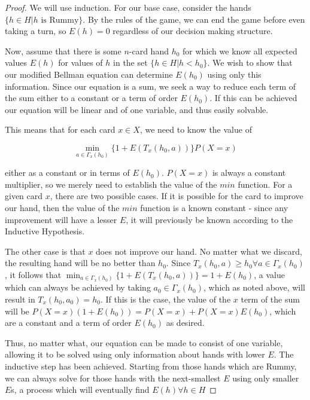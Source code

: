 \documentclass[letter,12pt]{article}
\begin{document}
\begin{proof}
We will use induction. For our base case, consider the hands $\{h \in H | h \textrm{ is Rummy}\}$. By the rules of the game, we can end the game before even taking a turn, so $E(h) = 0$ regardless of our decision making structure.

Now, assume that there is some $n$-card hand $h_0$ for which we know all expected values $E(h)$ for values of $h$ in the set $\{h \in H | h < h_0\}$. We wish to show that our modified Bellman equation can determine $E(h_0)$ using only this information. Since our equation is a sum, we seek a way to reduce each term of the sum either to a constant or a term of order $E(h_0)$. If this can be achieved our equation will be linear and of one variable, and thus easily solvable.

This means that for each card $x \in X$, we need to know the value of 

$$\min_{a \in \Gamma_x (h_0)}\{1+E(T_x(h_0,a))\} P(X=x)$$

either as a constant or in terms of $E(h_0)$. $P(X=x)$ is always a constant multiplier, so we merely need to establish the value of the $min$ function. For a given card $x$, there are two possible cases. If it is possible for the card to improve our hand, then the value of the $min$ function is a known constant - since any improvement will have a lesser $E$, it will previously be known according to the Inductive Hypothesis.

The other case is that $x$ does not improve our hand. No matter what we discard, the resulting hand will be no better than $h_0$. Since $T_x(h_0,a) \geq h_0 \forall a \in \Gamma_x (h_0)$, it follows that $\min_{a \in \Gamma_x (h_0)}\{1+E(T_x(h_0,a))\} = 1 + E(h_0)$, a value which can always be achieved by taking $a_0 \in  \Gamma_x (h_0)$, which as noted above, will result in $T_x(h_0,a_0)=h_0$. If this is the case, the value of the $x$ term of the sum will be $P(X=x)(1+E(h_0)) = P(X=x) + P(X=x)E(h_0)$, which are a constant and a term of order $E(h_0)$ as desired.

Thus, no matter what, our equation can be made to consist of one variable, allowing it to be solved using only information about hands with lower $E$. The inductive step has been achieved. Starting from those hands which are Rummy, we can always solve for those hands with the next-smallest $E$ using only smaller $E$s, a process which will eventually find $E(h) \forall h \in H$
\end{proof}
\end{document}
